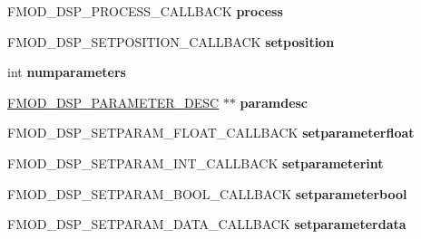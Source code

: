 \begin{DoxyCompactItemize}
\item 
\mbox{\label{structFMOD__DSP__DESCRIPTION_ac5963524abb4f794abf559d7af883cf6}} 
F\+M\+O\+D\+\_\+\+D\+S\+P\+\_\+\+P\+R\+O\+C\+E\+S\+S\+\_\+\+C\+A\+L\+L\+B\+A\+CK {\bfseries process}
\item 
\mbox{\label{structFMOD__DSP__DESCRIPTION_a21b36a0279ec8eb785da5854a92b038e}} 
F\+M\+O\+D\+\_\+\+D\+S\+P\+\_\+\+S\+E\+T\+P\+O\+S\+I\+T\+I\+O\+N\+\_\+\+C\+A\+L\+L\+B\+A\+CK {\bfseries setposition}
\item 
\mbox{\label{structFMOD__DSP__DESCRIPTION_a6258ca66c8ed1583159b0a6d3bf05d68}} 
int {\bfseries numparameters}
\item 
\mbox{\label{structFMOD__DSP__DESCRIPTION_ad04af03c4a86a1335dcc5dc611141b59}} 
\hyperlink{structFMOD__DSP__PARAMETER__DESC}{F\+M\+O\+D\+\_\+\+D\+S\+P\+\_\+\+P\+A\+R\+A\+M\+E\+T\+E\+R\+\_\+\+D\+E\+SC} $\ast$$\ast$ {\bfseries paramdesc}
\item 
\mbox{\label{structFMOD__DSP__DESCRIPTION_a29e99ce5530bbb8863b877a8fa3ba07f}} 
F\+M\+O\+D\+\_\+\+D\+S\+P\+\_\+\+S\+E\+T\+P\+A\+R\+A\+M\+\_\+\+F\+L\+O\+A\+T\+\_\+\+C\+A\+L\+L\+B\+A\+CK {\bfseries setparameterfloat}
\item 
\mbox{\label{structFMOD__DSP__DESCRIPTION_a2f545fba54c593711a6dd633c1d9d10b}} 
F\+M\+O\+D\+\_\+\+D\+S\+P\+\_\+\+S\+E\+T\+P\+A\+R\+A\+M\+\_\+\+I\+N\+T\+\_\+\+C\+A\+L\+L\+B\+A\+CK {\bfseries setparameterint}
\item 
\mbox{\label{structFMOD__DSP__DESCRIPTION_a8173e7f35101d5aedd2f8f4933815688}} 
F\+M\+O\+D\+\_\+\+D\+S\+P\+\_\+\+S\+E\+T\+P\+A\+R\+A\+M\+\_\+\+B\+O\+O\+L\+\_\+\+C\+A\+L\+L\+B\+A\+CK {\bfseries setparameterbool}
\item 
\mbox{\label{structFMOD__DSP__DESCRIPTION_a8f55fa30236a5117cec1d18622b4ffc1}} 
F\+M\+O\+D\+\_\+\+D\+S\+P\+\_\+\+S\+E\+T\+P\+A\+R\+A\+M\+\_\+\+D\+A\+T\+A\+\_\+\+C\+A\+L\+L\+B\+A\+CK {\bfseries setparameterdata}
\item 
\mbox{\label{structFMOD__DSP__DESCRIPTION_a50888c2a42b0a95ed7bcfb9488ec8d4f}} 
$$
\end{DoxyCompactItemize}
